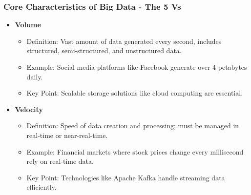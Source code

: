 \documentclass[aspectratio=169]{beamer}
\begin{document}
\begin{frame}[fragile]
    \frametitle{Core Characteristics of Big Data - The 5 Vs}
    \begin{itemize}
        \item \textbf{Volume}
        \begin{itemize}
            \item Definition: Vast amount of data generated every second, includes structured, semi-structured, and unstructured data.
            \item Example: Social media platforms like Facebook generate over 4 petabytes daily.
            \item Key Point: Scalable storage solutions like cloud computing are essential.
        \end{itemize}
        
        \item \textbf{Velocity}
        \begin{itemize}
            \item Definition: Speed of data creation and processing; must be managed in real-time or near-real-time.
            \item Example: Financial markets where stock prices change every millisecond rely on real-time data.
            \item Key Point: Technologies like Apache Kafka handle streaming data efficiently.
        \end{itemize}
    \end{itemize}
\end{frame}
\end{document}
